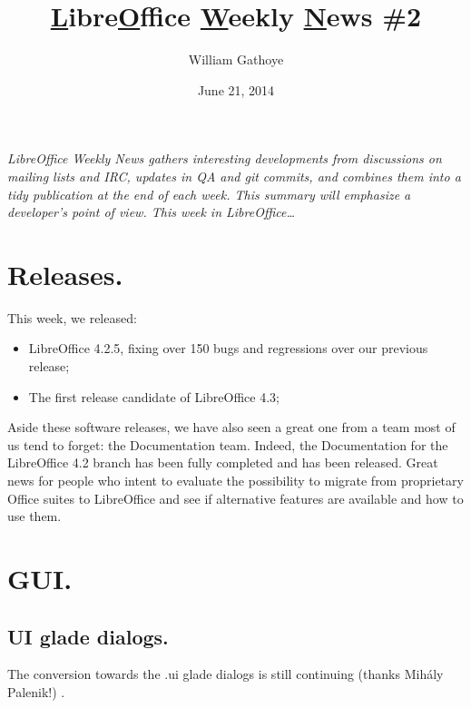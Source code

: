 \documentclass{article}
\begin{document}
\title{\underline{L}ibre\underline{O}ffice \underline{W}eekly \underline{N}ews \#2}\author{William
Gathoye}\date{June 21, 2014}\maketitle


\emph{LibreOffice Weekly News gathers interesting developments from discussions on mailing lists and IRC, updates in QA and git commits, and combines them into a tidy publication at the end of each week. This summary will emphasize a developer's point of view. This week in LibreOffice\ldots}

\tableofcontents



\section{Releases.}

This week, we released:

\begin{itemize}
    \item LibreOffice 4.2.5, fixing over 150 bugs and regressions over our previous release\cite{libo425};
    \item The first release candidate of LibreOffice 4.3\cite{libo43rc1};
\end{itemize}

Aside these software releases, we have also seen a great one from a team most of us tend to forget: the Documentation team. Indeed, the Documentation for the LibreOffice 4.2 branch has been fully completed and has been released\cite{doc42}. Great news for people who intent to evaluate the possibility to migrate from proprietary Office suites to LibreOffice and see if alternative features are available and how to use them.



\section{GUI.}

\subsection{UI glade dialogs.}

The conversion towards the .ui glade dialogs is still continuing (thanks Mihály Palenik!) \cite{gladeUi1,gladeUi2,gladeUi3,gladeUi4}.
\end{document}
